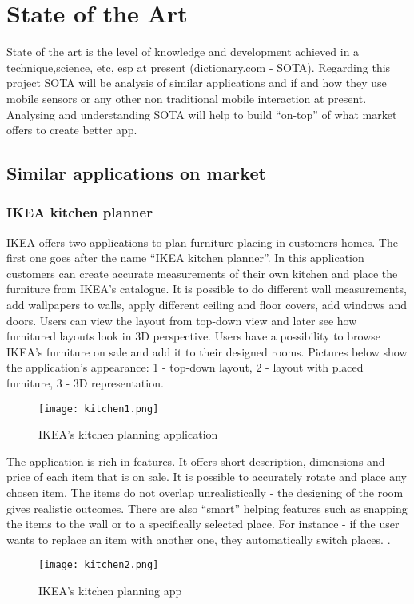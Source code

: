 \section{State of the Art}

State of the art is the level of knowledge and development achieved in a technique,science, etc, esp at present (dictionary.com - SOTA). Regarding this project SOTA will be analysis of similar applications and if and how they use mobile sensors or any other non traditional mobile interaction at present.  Analysing and understanding SOTA will help to build “on-top” of what market offers to create better app. 

\subsection{Similar applications on market} 
\subsubsection{IKEA kitchen planner}
IKEA offers two applications to plan furniture placing in customers homes. The first one goes after the name “IKEA kitchen planner”. In this application customers can create accurate measurements of their own kitchen and place the furniture from IKEA’s catalogue. It is possible to do different wall measurements, add wallpapers to walls, apply different ceiling and floor covers, add windows and doors. Users can view the layout from top-down view and later see how furnitured layouts look in 3D perspective.
Users have a possibility to browse IKEA’s furniture on sale and add it to their designed rooms.
Pictures below show the application’s appearance: 1 - top-down layout, 2 - layout with placed furniture, 3 - 3D representation.

\begin{figure}[H]
\centering
\texttt{[image: kitchen1.png]}
\caption{IKEA’s kitchen planning application}
\end{figure}


The application is rich in features. It offers short description, dimensions and price of each item that is on sale. It is possible to accurately rotate and place any chosen item. The items do not overlap unrealistically - the designing of the room gives realistic outcomes. There are also “smart” helping features such as snapping the items to the wall or to a specifically selected place. For instance - if the user wants to replace an item with another one, they automatically switch places.
.
\begin{figure}[H]
\centering
\texttt{[image: kitchen2.png]}
\caption{IKEA’s kitchen planning app}
\end{figure}

